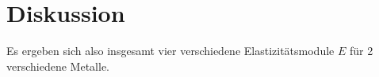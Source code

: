 \section{Diskussion}
\label{sec:Diskussion}


Es ergeben sich also insgesamt vier verschiedene Elastizitätsmodule $E$ für 2 verschiedene Metalle. 